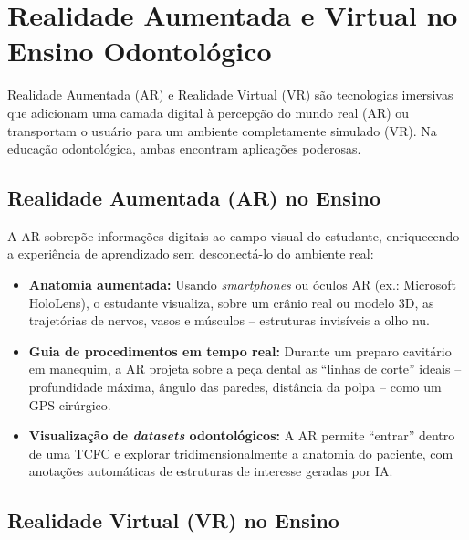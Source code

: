 
\section{Realidade Aumentada e Virtual no Ensino Odontológico}
\label{sec:ar-vr}

\nivelquatro

Realidade Aumentada (AR) e Realidade Virtual (VR) são tecnologias imersivas que
adicionam uma camada digital à percepção do mundo real (AR) ou transportam o
usuário para um ambiente completamente simulado (VR). Na educação odontológica,
ambas encontram aplicações poderosas.

 

\subsection{Realidade Aumentada (AR) no Ensino}

A AR sobrepõe informações digitais ao campo visual do estudante, enriquecendo a
experiência de aprendizado sem desconectá-lo do ambiente real:

\begin{itemize}
  \item \textbf{Anatomia aumentada:} Usando \textit{smartphones} ou óculos AR
    (ex.: Microsoft HoloLens), o estudante visualiza, sobre um crânio real ou
    modelo 3D, as trajetórias de nervos, vasos e músculos -- estruturas
    invisíveis a olho nu.

  \item \textbf{Guia de procedimentos em tempo real:} Durante um preparo
    cavitário em manequim, a AR projeta sobre a peça dental as ``linhas de
    corte'' ideais -- profundidade máxima, ângulo das paredes, distância da
    polpa -- como um GPS cirúrgico.

  \item \textbf{Visualização de \textit{datasets} odontológicos:} A AR permite
    ``entrar'' dentro de uma TCFC e explorar tridimensionalmente a anatomia
    do paciente, com anotações automáticas de estruturas de interesse geradas
    por IA.
\end{itemize}

\subsection{Realidade Virtual (VR) no Ensino}

